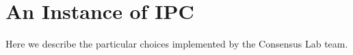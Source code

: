  \section{An Instance of IPC}
 \label{sec:impl-tmpl}
 Here we describe the particular choices implemented by the Consensus Lab team.